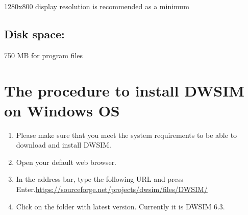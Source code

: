 \documentclass[12pt,a4paper]{article}
\begin{document}
1280x800 display resolution is recommended as a minimum

\subsection*{Disk space:}	

750 MB for program files

\section{The procedure to install DWSIM on Windows OS}

\begin{enumerate}
\item Please make sure that you meet the system requirements to be able to download and install DWSIM.
\item Open your default web browser.
\item In the address bar, type the following URL and press Enter.\newline \url{https://sourceforge.net/projects/dwsim/files/DWSIM/}

\item Click on the folder with latest version. Currently it is DWSIM 6.3.


\end{enumerate}
\end{document}
